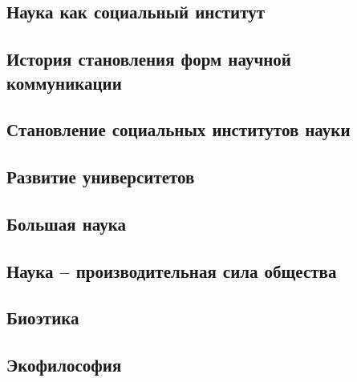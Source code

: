 \documentclass[main.tex]{subfiles}
\begin{document}

\subsection{Наука как социальный институт}


\subsection{История становления форм научной коммуникации}



\subsection{Становление социальных институтов науки}


\subsection{Развитие университетов}


\subsection{Большая наука}


\subsection{Наука -- производительная сила общества}









\subsection{Биоэтика}


\subsection{Экофилософия}


\end{document}
